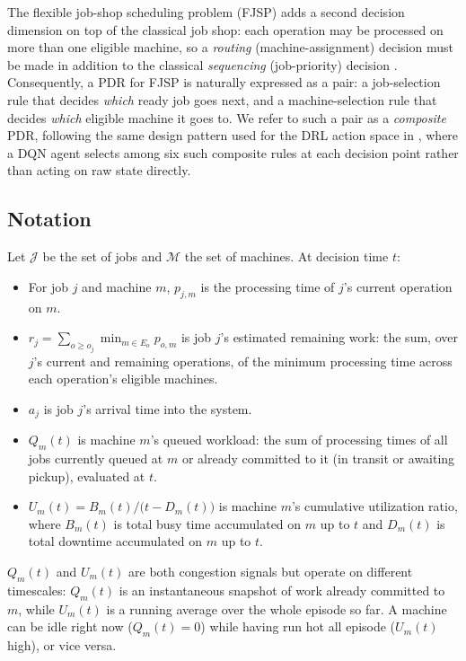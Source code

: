 \documentclass[conference]{IEEEtran}
\begin{document}
The flexible job-shop scheduling problem (FJSP) adds a second decision dimension on
top of the classical job shop: each operation may be processed on more than one
eligible machine, so a \emph{routing} (machine-assignment) decision must be made in
addition to the classical \emph{sequencing} (job-priority) decision
\citep{chaudhry2016, xie2019}. Consequently, a PDR for FJSP is naturally expressed as a
pair: a job-selection rule that decides \emph{which} ready job goes next, and a
machine-selection rule that decides \emph{which} eligible machine it goes to. We refer
to such a pair as a \emph{composite} PDR, following the same design pattern used for
the DRL action space in \cite{luo2020}, where a DQN agent selects among six such
composite rules at each decision point rather than acting on raw state directly.

\subsection{Notation}
\label{sec:notation}

Let $\mathcal{J}$ be the set of jobs and $\mathcal{M}$ the set of machines. At
decision time $t$:
\begin{itemize}[leftmargin=*]
  \item For job $j$ and machine $m$, $p_{j,m}$ is the processing time of $j$'s
        current operation on $m$.
  \item $r_j = \sum_{o \geq o_j} \min_{m \in E_o} p_{o,m}$ is job $j$'s estimated
        remaining work: the sum, over $j$'s current and remaining operations, of the
        minimum processing time across each operation's eligible machines.
  \item $a_j$ is job $j$'s arrival time into the system.
  \item $Q_m(t)$ is machine $m$'s queued workload: the sum of processing times of
        all jobs currently queued at $m$ or already committed to it (in transit or
        awaiting pickup), evaluated at $t$.
  \item $U_m(t) = B_m(t) \big/ \big(t - D_m(t)\big)$ is machine $m$'s cumulative
        utilization ratio, where $B_m(t)$ is total busy time accumulated on $m$ up to
        $t$ and $D_m(t)$ is total downtime accumulated on $m$ up to $t$.
\end{itemize}
$Q_m(t)$ and $U_m(t)$ are both congestion signals but operate on different
timescales: $Q_m(t)$ is an instantaneous snapshot of work already committed to $m$,
while $U_m(t)$ is a running average over the whole episode so far. A machine can be
idle right now ($Q_m(t) = 0$) while having run hot all episode ($U_m(t)$ high), or
vice versa.
\end{document}
